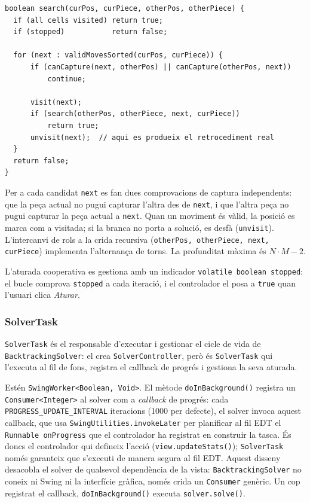 \documentclass[conference,compsoc]{IEEEtran}
\begin{document}
\begin{lstlisting}[caption={Esquelet del backtracking recursiu.},label={lst:backtracking},float=h]
boolean search(curPos, curPiece, otherPos, otherPiece) {
  if (all cells visited) return true;
  if (stopped)           return false;

  for (next : validMovesSorted(curPos, curPiece)) {
      if (canCapture(next, otherPos) || canCapture(otherPos, next))
          continue;

      visit(next);
      if (search(otherPos, otherPiece, next, curPiece))
          return true;
      unvisit(next);  // aqui es produeix el retrocediment real
  }
  return false;
}
\end{lstlisting}

Per a cada candidat \texttt{next} es fan dues comprovacions de captura
independents: que la peça actual no pugui capturar l'altra des de
\texttt{next}, i que l'altra peça no pugui capturar la peça actual a
\texttt{next}. Quan un moviment és vàlid, la posició es marca com a
visitada; si la branca no porta a solució, es desfà (\texttt{unvisit}).
L'intercanvi de rols a la crida
recursiva (\texttt{otherPos, otherPiece, next, curPiece}) implementa
l'alternança de torns.
La profunditat màxima és $N \cdot M - 2$.

L'aturada cooperativa es gestiona amb un indicador \texttt{volatile
boolean stopped}: el bucle comprova \texttt{stopped} a cada iteració,
i el controlador el posa a \texttt{true} quan l'usuari clica \textit{Aturar}.

\subsubsection{SolverTask}

\texttt{SolverTask} és el responsable d'executar i gestionar el cicle
de vida de \texttt{BacktrackingSolver}: el crea \texttt{SolverController},
però és \texttt{SolverTask} qui l'executa al fil de fons, registra
el callback de progrés i gestiona la seva aturada.

Estén \texttt{SwingWorker<Boolean, Void>}. El mètode \texttt{doInBackground()}
registra un \texttt{Consumer<Integer>}
al solver com a \textit{callback} de progrés: cada
\texttt{PROGRESS\_UPDATE\_INTERVAL} iteracions (1000 per defecte),
el solver invoca aquest callback, que usa
\texttt{SwingUtilities.invokeLater} per planificar al fil EDT el
\texttt{Runnable onProgress} que el controlador ha registrat en
construir la tasca. És doncs el controlador qui defineix l'acció
(\texttt{view.updateStats()}); \texttt{SolverTask} només garanteix
que s'executi de manera segura al fil EDT. Aquest disseny desacobla
el solver de qualsevol dependència de la vista:
\texttt{BacktrackingSolver} no coneix ni Swing ni la interfície
gràfica, només crida un \texttt{Consumer} genèric. Un cop registrat
el callback, \texttt{doInBackground()} executa \texttt{solver.solve()}.
\end{document}
